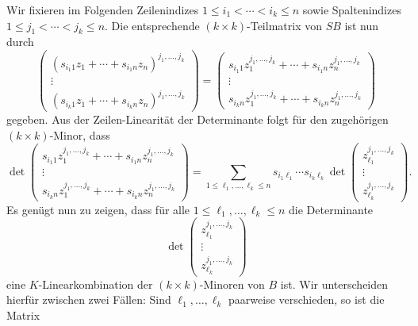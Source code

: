 Wir fixieren im Folgenden Zeilenindizes $1 \leq i_1 < \dotsb < i_k \leq n$ sowie Spaltenindizes $1 \leq j_1 < \dotsb < j_k \leq n$.
Die entsprechende $(k \times k)$-Teilmatrix von $SB$ ist nun durch
\[
    \begin{pmatrix}
      (s_{i_1 1} z_1 + \dotsb + s_{i_1 n} z_n)^{j_1, \dotsc, j_k} \\
      \vdots                                                      \\
      (s_{i_k 1} z_1 + \dotsb + s_{i_k n} z_n)^{j_1, \dotsc, j_k}
    \end{pmatrix}
  = \begin{pmatrix}
      s_{i_1 1} z_1^{j_1, \dotsc, j_k} + \dotsb + s_{i_1 n} z_n^{j_1, \dotsc, j_k}  \\
      \vdots                                                                        \\
      s_{i_k n} z_1^{j_1, \dotsc, j_k} + \dotsb + s_{i_k n} z_n^{j_1, \dotsc, j_k}
    \end{pmatrix}
\]
gegeben.
Aus der Zeilen-Linearität der Determinante folgt für den zugehörigen $(k \times k)$-Minor, dass
\[
    \det
    \begin{pmatrix}
      s_{i_1 1} z_1^{j_1, \dotsc, j_k} + \dotsb + s_{i_1 n} z_n^{j_1, \dotsc, j_k}  \\
      \vdots                                                                        \\
      s_{i_k n} z_1^{j_1, \dotsc, j_k} + \dotsb + s_{i_k n} z_n^{j_1, \dotsc, j_k}
    \end{pmatrix}
  = \sum_{1 \leq \ell_1, \dotsc, \ell_k \leq n}
    s_{i_1 \ell_1} \dotsm s_{i_k \ell_k}
    \det
    \begin{pmatrix}
      z_{\ell_1}^{j_1, \dotsc, j_k} \\
      \vdots                        \\
      z_{\ell_k}^{j_1, \dotsc, j_k}
    \end{pmatrix}.
\]
Es genügt nun zu zeigen, dass für alle $1 \leq \ell_1, \dotsc, \ell_k \leq n$ die Determinante
\[
    \det
    \begin{pmatrix}
      z_{\ell_1}^{j_1, \dotsc, j_k} \\
      \vdots                        \\
      z_{\ell_k}^{j_1, \dotsc, j_k}
    \end{pmatrix}
\]
eine $K$-Linearkombination der $(k \times k)$-Minoren von $B$ ist.
Wir unterscheiden hierfür zwischen zwei Fällen:
Sind $\ell_1, \dotsc, \ell_k$ paarweise verschieden, so ist die Matrix
